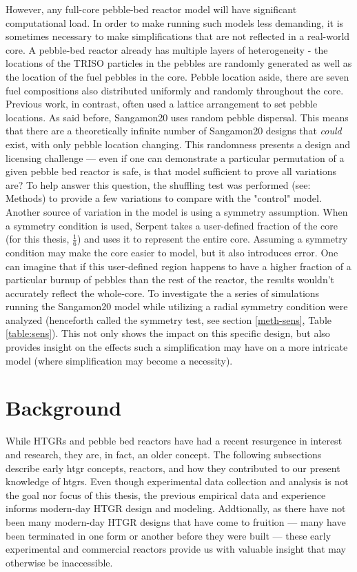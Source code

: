 However, any full-core pebble-bed reactor model will have significant computational load.  In order to make running such models less demanding, it is sometimes necessary to make simplifications that are not reflected in a real-world core.  A pebble-bed reactor already has multiple layers of heterogeneity - the locations of the TRISO particles in the pebbles are randomly generated as well as the location of the fuel pebbles in the core.  Pebble location aside, there are seven fuel compositions also distributed uniformly and randomly throughout the core.  Previous work, in contrast, often used a lattice arrangement to set pebble locations. As said before, Sangamon20 uses random pebble dispersal.  This means that there are a theoretically infinite number of Sangamon20 designs that \emph{could} exist, with only pebble location changing.  This randomness presents a design and licensing challenge --- even if one can demonstrate a particular permutation of a given pebble bed reactor is safe, is that model sufficient to prove all variations are?  To help answer this question, the shuffling test was performed (see: Methods) to provide a few variations to compare with the "control" model. Another source of variation in the model is using a symmetry assumption.  When a symmetry condition is used, Serpent takes a user-defined fraction of the core (for this thesis, $\frac{1}{6}$) and uses it to represent the entire core.  Assuming a symmetry condition may make the core easier to model, but it also introduces error.  One can imagine that if this user-defined region happens to have a higher fraction of a particular burnup of pebbles than the rest of the reactor, the results wouldn't accurately reflect the whole-core.  To investigate the a series of simulations running the Sangamon20 model while utilizing a radial symmetry condition were analyzed (henceforth called the symmetry test, see section \autoref{meth-sens}, Table \ref{table:sens}).  This not only shows the impact on this specific design, but also provides insight on the effects such a simplification may have on a more intricate model (where simplification may become a necessity).

\section{Background}
\label{sec:intro-background}

While HTGRs and pebble bed reactors have had a recent resurgence in interest and research, they are, in fact, an older concept.  The following subsections describe early \acrshort{htgr} concepts, reactors, and how they contributed to our present knowledge of \acrshort{htgr}s.  Even though experimental data collection and analysis is not the goal nor focus of this thesis, the previous empirical data and experience informs modern-day HTGR design and modeling.  Addtionally, as there have not been many modern-day HTGR designs that have come to fruition --- many have been terminated in one form or another before they were built --- these early experimental and commercial reactors provide us with valuable insight that may otherwise be inaccessible.

